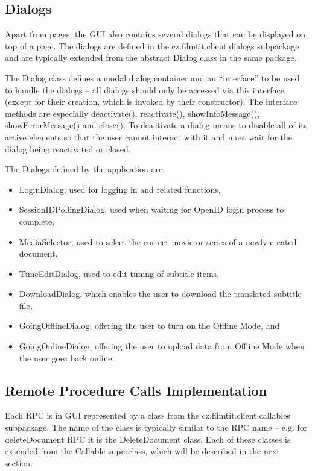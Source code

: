 
\subsection{Dialogs}

Apart from pages, the GUI also contains several dialogs that can be displayed on top of a page. The dialogs are defined in the cz.filmtit.client.dialogs subpackage and are typically extended from the abstract Dialog class in the same package.

The Dialog class defines a modal dialog container and an ``interface'' to be used to handle the dialogs -- all dialogs should only be accessed via this interface (except for their creation, which is invoked by their constructor).
The interface methods are especially
deactivate(), reactivate(), showInfoMessage(), showErrorMessage() and close(). To deactivate a dialog means to disable all of its active elements so that the user cannot interact with it and must wait for the dialog being reactivated or closed.

The Dialogs defined by the application are:
\begin{itemize}
\item LoginDialog, used for logging in and related functions,
\item SessionIDPollingDialog, used when waiting for OpenID login process to complete,
\item MediaSelector, used to select the correct movie or series of a newly created document,
\item TimeEditDialog, used to edit timing of subtitle items,
\item DownloadDialog, which enables the user to download the translated subtitle file,
\item GoingOfflineDialog, offering the user to turn on the Offline Mode, and
\item GoingOnlineDialog, offering the user to upload data from Offline Mode when the user goes back online
\end{itemize}

\subsection{Remote Procedure Calls Implementation}

Each RPC is in GUI represented by a class from the cz.filmtit.client.callables subpackage. The name of the class is typically similar to the RPC name -- e.g. for deleteDocument RPC it is the DeleteDocument class. Each of these classes is extended from the Callable superclass, which will be described in the next section.

